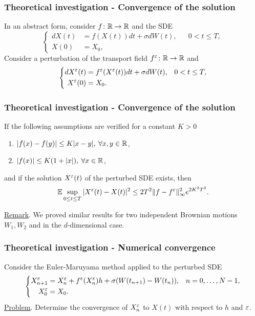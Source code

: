 \begin{frame}
\frametitle{Theoretical investigation - Convergence of the solution}
In an abstract form, consider $f\colon \mathbb{R} \to \mathbb{R}$ and the SDE
\begin{equation*}
\left \{
\begin{aligned}
	dX(t) &= f(X(t))dt + \sigma dW(t), && 0 < t \leq T, \\
	X(0) &= X_0,
\end{aligned} \right .
\end{equation*}
Consider a perturbation of the transport field $f^\varepsilon\colon \mathbb{R} \rightarrow \mathbb{R}$ and
\begin{equation*}
\left \{
\begin{aligned}
	dX^\varepsilon(t) &= f^\varepsilon(X^\varepsilon(t))dt + \sigma dW(t), && 0 < t \leq T, \\
	X^\varepsilon(0) &= X_0.
\end{aligned} \right .
\end{equation*}

\end{frame}

\begin{frame}
\frametitle{Theoretical investigation - Convergence of the solution}
\begin{proposition} If the following assumptions are verified for a constant $K > 0$
\begin{enumerate}
	\item $|f(x) - f(y)| \leq K|x - y|, \: \forall x,y \in \mathbb{R}$,
	\item $|f(x)| \leq K(1 + |x|), \: \forall x \in \mathbb{R}$,
\end{enumerate}
and if the solution $X^\varepsilon(t)$ of the perturbed SDE exists, then
\begin{equation*}
	\mathbb{E} \sup_{0 \leq t \leq T} |X^\varepsilon(t) - X(t)|^2 \leq  2T^2 \|f - f^\varepsilon\|_{\infty}^2 e^{2K^2T^2}.
\end{equation*}
\end{proposition}
\underline{Remark}. We proved similar results for two independent Brownian motions $W_1, W_2$ and in the $d$-dimensional case.
\end{frame}

\begin{frame}
\frametitle{Theoretical investigation - Numerical convergence}
Consider the Euler-Maruyama method applied to the perturbed SDE
\begin{equation*}
\left \{
\begin{aligned}
	X^\varepsilon_{n+1} &= X^\varepsilon_n + f^\varepsilon(X^\varepsilon_n)h + \sigma (W(t_{n+1}) - W(t_n)), && n = 0, \dots, N - 1, \\
	X^\varepsilon_0 &= X_0.
\end{aligned} \right .
\end{equation*}
\underline{Problem}. Determine the convergence of $X^\varepsilon_n$ to $X(t)$ with respect to $h$ and $\varepsilon$.
\end{frame}

